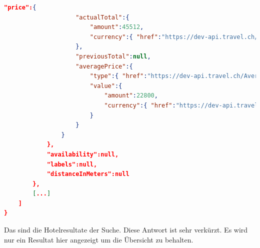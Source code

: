 \begin{lstlisting}[language=json,firstnumber=1]
                "price":{
                    "actualTotal":{
                        "amount":45512,
                        "currency":{ "href":"https://dev-api.travel.ch/Currency/CHF" }
                    },
                    "previousTotal":null,
                    "averagePrice":{
                        "type":{ "href":"https://dev-api.travel.ch/AveragePriceType/PerPerson" },
                        "value":{
                            "amount":22800,
                            "currency":{ "href":"https://dev-api.travel.ch/Currency/CHF" }
                        }
                    }
                }
            },
            "availability":null,
            "labels":null,
            "distanceInMeters":null
        },
        [...]
    ]
}
\end{lstlisting}
Das sind die Hotelresultate der Suche. Diese Antwort ist sehr verkürzt. Es wird nur ein Resultat hier angezeigt um die Übersicht zu behalten.



